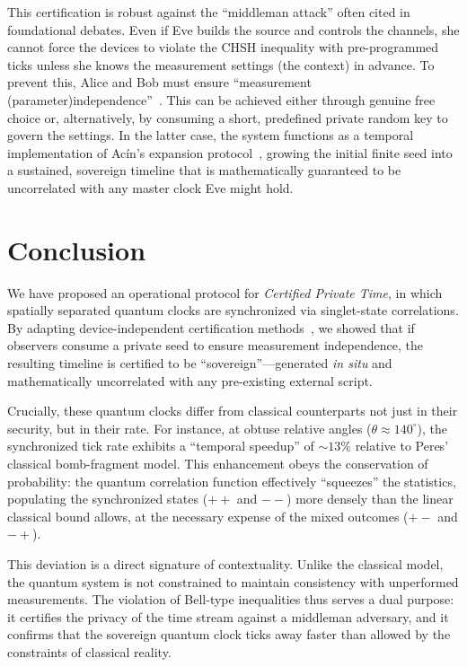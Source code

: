 \documentclass[entropy,article,submit,moreauthors,pdftex]{Definitions/mdpi}
\begin{document}
This certification is robust against the ``middleman attack'' often cited in foundational debates. Even if Eve builds the source and controls the channels, she cannot force the devices to violate the CHSH inequality with pre-programmed ticks unless she knows the measurement settings (the context) in advance. To prevent this, Alice and Bob must ensure ``measurement (parameter)independence''~\cite{shimony_1993}. This can be achieved either through genuine free choice or, alternatively, by consuming a short, predefined private random key to govern the settings. In the latter case, the system functions as a temporal implementation of Ac\'in's expansion protocol~\cite{Acin2016CertifiedRandomness}, growing the initial finite seed into a sustained, sovereign timeline that is mathematically guaranteed to be uncorrelated with any master clock Eve might hold.

\section{Conclusion}

We have proposed an operational protocol for \emph{Certified Private Time}, in which spatially separated quantum clocks are synchronized via singlet-state correlations. By adapting device-independent certification methods~\cite{Acin2016CertifiedRandomness}, we showed that if observers consume a private seed to ensure measurement independence, the resulting timeline is certified to be ``sovereign''---generated \emph{in situ} and mathematically uncorrelated with any pre-existing external script.

Crucially, these quantum clocks differ from classical counterparts not just in their security, but in their rate. For instance, at obtuse relative angles ($\theta \approx 140^\circ$), the synchronized tick rate exhibits a ``temporal speedup'' of ${\sim}13\%$ relative to Peres' classical bomb-fragment model. This enhancement obeys the conservation of probability: the quantum correlation function effectively ``squeezes'' the statistics, populating the synchronized states ($++$ and $--$) more densely than the linear classical bound allows, at the necessary expense of the mixed outcomes ($+-$ and $-+$).

This deviation is a direct signature of contextuality. Unlike the classical model, the quantum system is not constrained to maintain consistency with unperformed measurements. The violation of Bell-type inequalities thus serves a dual purpose: it certifies the privacy of the time stream against a middleman adversary, and it confirms that the sovereign quantum clock ticks away faster than allowed by the constraints of classical reality.
\end{document}
